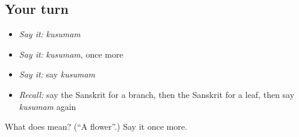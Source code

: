 \subsection*{Your turn}
\begin{itemize}
\raggedright
  \item \emph{Say it:} \emph{kusumam}
  \item \emph{Say it:} \emph{kusumam}, once more
  \item \emph{Say it:} say \emph{kusumam}
  \item \emph{Recall:} say the Sanskrit for a branch, then the Sanskrit for a leaf, then say \emph{kusumam} again
\end{itemize}

\begin{tcolorbox}[breakable,colback=teal!4,colframe=teal!35!black,title={Before you move on}]
What does  mean? (\textquotedblleft{}A flower\textquotedblright{}.) Say it once more.
\end{tcolorbox}
